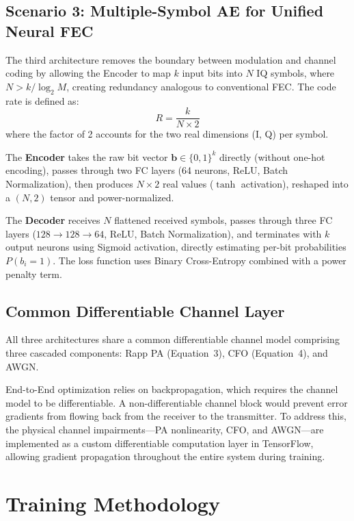 \documentclass{JECnew}
\begin{document}
\subsection{Scenario 3: Multiple-Symbol AE for Unified Neural FEC}

The third architecture removes the boundary between modulation and channel coding by allowing the Encoder to map $k$ input bits into $N$ IQ symbols, where $N > k / \log_2 M$, creating redundancy analogous to conventional FEC. The code rate is defined as:
\begin{equation}
R = \frac{k}{N \times 2}
\end{equation}
where the factor of 2 accounts for the two real dimensions (I, Q) per symbol.

The \textbf{Encoder} takes the raw bit vector $\mathbf{b} \in \{0, 1\}^k$ directly (without one-hot encoding), passes through two FC layers (64 neurons, ReLU, Batch Normalization), then produces $N \times 2$ real values ($\tanh$ activation), reshaped into a $(N, 2)$ tensor and power-normalized.

The \textbf{Decoder} receives $N$ flattened received symbols, passes through three FC layers ($128 \to 128 \to 64$, ReLU, Batch Normalization), and terminates with $k$ output neurons using Sigmoid activation, directly estimating per-bit probabilities $P(b_i = 1)$. The loss function uses Binary Cross-Entropy combined with a power penalty term.

\subsection{Common Differentiable Channel Layer}

All three architectures share a common differentiable channel model comprising three cascaded components: Rapp PA (Equation~3), CFO (Equation~4), and AWGN.

End-to-End optimization relies on backpropagation, which requires the channel model to be differentiable. A non-differentiable channel block would prevent error gradients from flowing back from the receiver to the transmitter. To address this, the physical channel impairments---PA nonlinearity, CFO, and AWGN---are implemented as a custom differentiable computation layer in TensorFlow, allowing gradient propagation throughout the entire system during training.

\section{Training Methodology}
\end{document}
